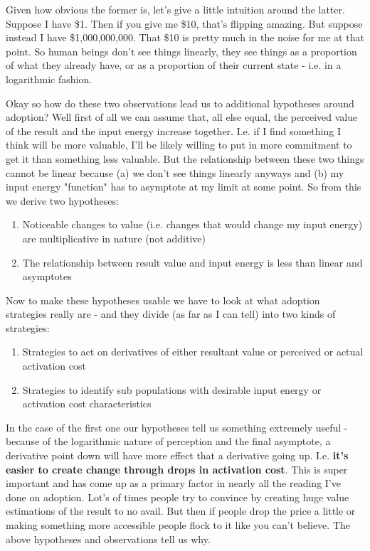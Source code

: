\documentclass[10pt,a5paper]{book}
\begin{document}
Given how obvious the former is, let's give a little intuition around the latter. Suppose I have \$1. Then if you give me \$10, that's flipping amazing. But suppose instead I have \$1,000,000,000. That \$10 is pretty much in the noise for me at that point. So human beings don't see things linearly, they see things as a proportion of what they already have, or as a proportion of their current state - i.e. in a logarithmic fashion. 

Okay so how do these two observations lead us to additional hypotheses around adoption? Well first of all we can assume that, all else equal, the perceived value of the result and the input energy increase together. I.e. if I find something I think will be more valuable, I'll be likely willing to put in more commitment to get it than something less valuable. But the relationship between these two things cannot be linear because (a) we don't see things linearly anyways and (b) my input energy "function" has to asymptote at my limit at some point. So from this we derive two hypotheses:
\begin{enumerate}
\item Noticeable changes to value (i.e. changes that would change my input energy) are multiplicative in nature (not additive) 
\item The relationship between result value and input energy is less than linear and asymptotes
\end{enumerate}

Now to make these hypotheses usable we have to look at what adoption strategies really are - and they divide (as far as I can tell) into two kinds of strategies:
\begin{enumerate}
\item Strategies to act on derivatives of either resultant value or perceived or actual activation cost
\item Strategies to identify sub populations with desirable input energy or activation cost characteristics 
\end{enumerate}

In the case of the first one our hypotheses tell us something extremely useful - because of the logarithmic nature of perception and the final asymptote, a derivative point down will have more effect that a derivative going up. I.e. \textbf{it's easier to create change through drops in activation cost}. This is super important and has come up as a primary factor in nearly all the reading I've done on adoption. Lot's of times people try to convince by creating huge value estimations of the result to no avail. But then if people drop the price a little or making something more accessible people flock to it like you can't believe. The above hypotheses and observations tell us why. 
\end{document}

